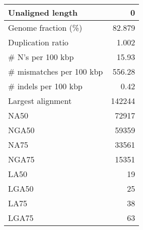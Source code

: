 \documentclass[12pt,a4paper]{article}
\begin{document}
\begin{table}[ht]
\begin{center}
\begin{tabular}{|l*{1}{|r}|}
Unaligned length & 0 \\ \hline
Genome fraction (\%) & 82.879 \\ \hline
Duplication ratio & 1.002 \\ \hline
\# N's per 100 kbp & 15.93 \\ \hline
\# mismatches per 100 kbp & 556.28 \\ \hline
\# indels per 100 kbp & 0.42 \\ \hline
Largest alignment & 142244 \\ \hline
NA50 & 72917 \\ \hline
NGA50 & 59359 \\ \hline
NA75 & 33561 \\ \hline
NGA75 & 15351 \\ \hline
LA50 & 19 \\ \hline
LGA50 & 25 \\ \hline
LA75 & 38 \\ \hline
LGA75 & 63 \\ \hline
\end{tabular}
\end{center}
\end{table}
\end{document}
